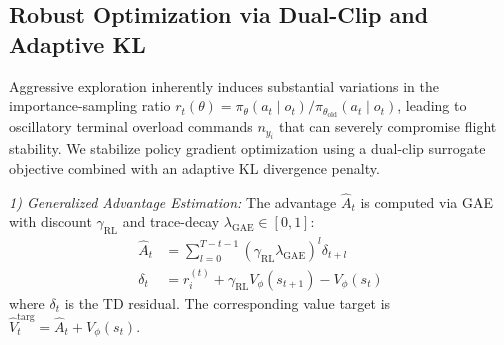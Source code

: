 \documentclass[lettersize,journal]{IEEEtran}
\begin{document}
\subsection{Robust Optimization via Dual-Clip and Adaptive KL}
\label{subsec:dual_clip_kl}

Aggressive exploration inherently induces substantial variations in the importance-sampling ratio $r_t(\theta) = \pi_\theta(a_t \mid o_t) / \pi_{\theta_{\mathrm{old}}}(a_t \mid o_t)$, leading to oscillatory terminal overload commands $n_{y_i}$ that can severely compromise flight stability. We stabilize policy gradient optimization using a dual-clip surrogate objective combined with an adaptive KL divergence penalty.

\emph{1) Generalized Advantage Estimation:} The advantage $\hat{A}_t$ is computed via GAE with discount $\gamma_{\mathrm{RL}}$ and trace-decay $\lambda_{\mathrm{GAE}} \in [0,1]$:
\begin{align}
\hat{A}_t &= \sum_{l=0}^{T-t-1} (\gamma_{\mathrm{RL}}\lambda_{\mathrm{GAE}})^l \delta_{t+l} \label{eq:gae_A} \\
\delta_t &= r_i^{(t)} + \gamma_{\mathrm{RL}} V_\phi(s_{t+1}) - V_\phi(s_t) \label{eq:gae_delta}
\end{align}
where $\delta_t$ is the TD residual. The corresponding value target is $\hat{V}_t^{\mathrm{targ}} = \hat{A}_t + V_\phi(s_t)$.
\end{document}
